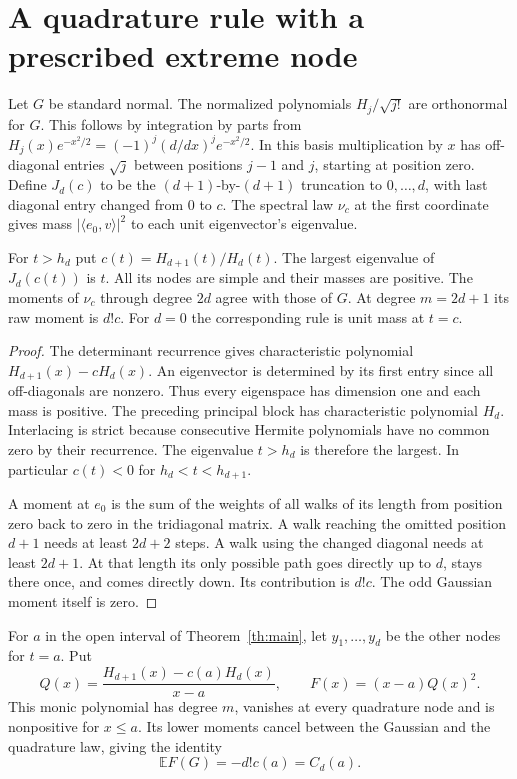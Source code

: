 \documentclass[11pt,letterpaper]{article}
\theoremstyle{research}
\newcommand{\E}{\mathbb E}\newcommand{\R}{\mathbb R}\newcommand{\N}{\mathbb N}
\newcommand{\sect}[1]{\section{\texorpdfstring{\color{ink}#1}{#1}}}
\begin{document}
\clearpage
\sect{A quadrature rule with a prescribed extreme node}
Let $G$ be standard normal. The normalized polynomials $H_j/\sqrt{j!}$
are orthonormal for $G$. This follows by integration by parts from
$H_j(x)e^{-x^2/2}=(-1)^j(d/dx)^j e^{-x^2/2}$. In this basis multiplication
by $x$ has off-diagonal entries $\sqrt j$ between positions $j-1$ and $j$,
starting at position zero. Define $J_d(c)$ to be the $(d+1)$-by-$(d+1)$
truncation to $0,\ldots,d$, with last diagonal entry changed from $0$ to $c$.
The spectral law $\nu_c$ at the first coordinate gives mass
$|\langle e_0,v\rangle|^2$ to each unit eigenvector's eigenvalue.
\begin{lemma}\label{lem:radau}
For $t>h_d$ put $c(t)=H_{d+1}(t)/H_d(t)$. The largest eigenvalue of
$J_d(c(t))$ is $t$. All its nodes are simple and their masses are positive.
The moments of $\nu_c$ through degree $2d$ agree with those of $G$.
At degree $m=2d+1$ its raw moment is $d!c$. For $d=0$ the corresponding
rule is unit mass at $t=c$.
\end{lemma}
\begin{proof}
The determinant recurrence gives characteristic polynomial
$H_{d+1}(x)-cH_d(x)$. An eigenvector is determined by its first entry since
all off-diagonals are nonzero. Thus every eigenspace has dimension one and
each mass is positive. The preceding principal block has characteristic
polynomial $H_d$. Interlacing is strict because consecutive Hermite
polynomials have no common zero by their recurrence. The eigenvalue $t>h_d$
is therefore the largest. In particular $c(t)<0$ for $h_d<t<h_{d+1}$.

A moment at $e_0$ is the sum of the weights of all walks of its length
from position zero back to zero in the tridiagonal matrix. A walk reaching
the omitted position $d+1$ needs at least $2d+2$ steps. A walk using the
changed diagonal needs at least $2d+1$. At that length its only possible
path goes directly up to $d$, stays there once, and comes directly down.
Its contribution is $d!c$. The odd Gaussian moment itself is zero.
\end{proof}
For $a$ in the open interval of Theorem~\ref{th:main}, let
$y_1,\ldots,y_d$ be the other nodes for $t=a$. Put
\[
 Q(x)=\frac{H_{d+1}(x)-c(a)H_d(x)}{x-a},\qquad
 F(x)=(x-a)Q(x)^2 .
\]
This monic polynomial has degree $m$, vanishes at every quadrature node and
is nonpositive for $x\le a$. Its lower moments cancel between the Gaussian
and the quadrature law, giving the identity
\begin{equation}\label{eq:witness}
             \E F(G)=-d!c(a)=C_d(a).
\end{equation}
\end{document}
